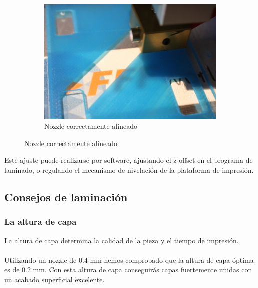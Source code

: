 \documentclass[11pt,a4paper]{article}
\begin{document}
\begin{figure}[H]
\begin{subfigure}[b]{0.3\textwidth}
        \includegraphics[width=\textwidth,cfbox=azul_marcos 3pt 0pt]{FOTOS/HOTENDPERFECTO}
	\caption*{Nozzle correctamente alineado}
    \end{subfigure}
\end{figure}
Este ajuste puede realizarse por software, ajustando el z-offset en el programa de laminado, o regulando el mecanismo de nivelación de la plataforma de impresión.
	\subsection{Consejos de laminación}
		\subsubsection{La altura de capa}
La altura de capa determina la calidad de la pieza y el tiempo de impresión.
\\\\
Utilizando un nozzle de 0.4 mm hemos comprobado que la altura de capa óptima es de 0.2 mm. Con esta altura de capa conseguirás capas fuertemente unidas con un acabado superficial excelente.
\end{document}
